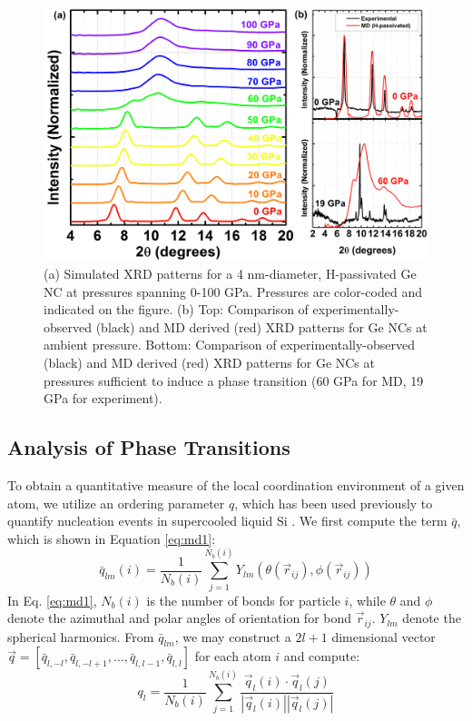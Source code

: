 \begin{figure}
\begin{center}
\includegraphics[width=\textwidth]{./chapter7/md3.png}
\caption[Simulated XRD patterns at a range of pressures and comparison of simulated and experimental XRD patterns for passivated Ge NCs.]{(a) Simulated XRD patterns for a 4 nm-diameter, H-passivated Ge NC at pressures spanning 0-100 GPa. Pressures are color-coded and indicated on the figure. (b) Top: Comparison of experimentally-observed (black) and MD derived (red) XRD patterns for Ge NCs at ambient pressure. Bottom: Comparison of experimentally-observed (black) and MD derived (red) XRD patterns for Ge NCs at pressures sufficient to induce a phase transition (60 GPa for MD, 19 GPa for experiment).}
\label{f:md3}
\end{center}
\end{figure}

\subsection{Analysis of Phase Transitions}

To obtain a quantitative measure of the local coordination environment of a given atom, we utilize an ordering parameter $q$,\cite{PhysRevB.28.784} which has been used previously to quantify nucleation events in supercooled liquid Si \cite{li2009nucleation}. We first compute the term $\bar{q}$, which is shown in Equation \ref{eq:md1}:
\begin{equation}\label{eq:md1}
\bar{q}_{lm}(i) = \frac{1}{N_b\left(i\right)}\sum_{j=1}^{N_b\left(i\right)} Y_{lm}\left(\theta\left(\vec{r}_{ij}\right), \phi\left(\vec{r}_{ij}\right)\right)
\end{equation}
In Eq. \ref{eq:md1}, $N_b(i)$ is the number of bonds for particle $i$, while $\theta$ and $\phi$ denote the azimuthal and polar angles of orientation for bond $\vec{r}_{ij}$. $Y_{lm}$ denote the spherical harmonics. From $\bar{q}_{lm}$, we may construct a $2l+1$ dimensional vector $\vec{q} = \left[\bar{q}_{l,-l}, \bar{q}_{l,-l+1}, ..., \bar{q}_{l, l-1}, \bar{q}_{l,l}\right]$ for each atom $i$ and compute:
\begin{equation}\label{eq:md2}
q_l = \frac{1}{N_b\left(i\right)}\sum_{j=1}^{N_b\left(i\right)}\frac{\vec{q}_l\left(i\right)\cdot\vec{q}_l\left(j\right)}{|\vec{q}_l\left(i\right)||\vec{q}_l\left(j\right)|}
\end{equation}

